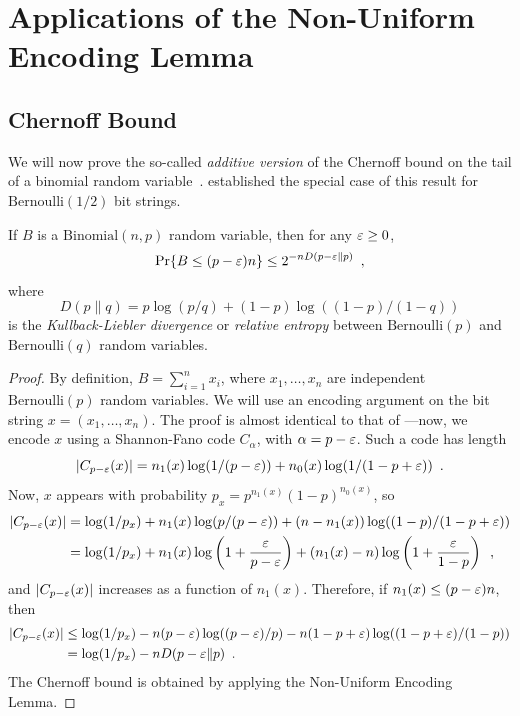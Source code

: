 \documentclass{patmorin}
\begin{document}
\section{Applications of the Non-Uniform Encoding Lemma}

\subsection{Chernoff Bound}

We will now prove the so-called \emph{additive version} of the
Chernoff bound on the tail of a binomial random
variable~\cite{chernoff:bound}.  established
the special case of this result for $\mathrm{Bernoulli}(1/2)$ bit
strings.

\begin{thm}
  If $B$ is a $\mathrm{Binomial}(n,p)$ random variable, then for any
  $\varepsilon \geq 0$,
  \[
    \Pr\{B\le(p-\varepsilon)n\} \le 2^{-nD(p-\varepsilon \| p)} \enspace ,
  \]
  where 
  \[ 
    D(p \| q)= p\log (p/q) + (1-p)\log ((1 - p)/(1 - q))
  \]
  is the \emph{Kullback-Liebler divergence} or \emph{relative entropy}
  between $\mathrm{Bernoulli}(p)$ and $\mathrm{Bernoulli}(q)$ random
  variables.
\end{thm}

\begin{proof}
  By definition, $B=\sum_{i=1}^n x_i$, where $x_1,\ldots,x_n$ are
  independent $\mathrm{Bernoulli}(p)$ random variables.  We will use
  an encoding argument on the bit string $x=(x_1,\ldots,x_n)$. The
  proof is almost identical to that of ---now,
  we encode $x$ using a Shannon-Fano code $C_\alpha$, with
  $\alpha = p - \varepsilon$. Such a code has length
  \[
    |C_{p - \varepsilon}(x)| = n_1(x) \log (1/(p - \varepsilon)) + n_0(x) \log (1/(1
    - p + \varepsilon)) \enspace .
  \]
  Now, $x$ appears with probability
  $p_x = p^{n_1(x)} (1 - p)^{n_0(x)}$, so
  \begin{align*}
    |C_{p - \varepsilon}(x)| &= \log(1/p_x) + n_1(x) \log (p/(p - \varepsilon)) + (n - n_1(x)) \log ((1 - p)/(1 - p + \varepsilon)) \\
                      &= \log (1/p_x) + n_1(x) \log \left(1 + \frac{\varepsilon}{p - \varepsilon}\right) + (n_1(x) - n) \log \left(1 + \frac{\varepsilon}{1 - p}\right) \enspace ,
  \end{align*}
  and $|C_{p - \varepsilon}(x)|$ increases as a function of
  $n_1(x)$. Therefore, if $n_1(x) \le (p - \varepsilon)n$, then
  \begin{align*}
    |C_{p - \varepsilon}(x)| &\le \log (1/p_x) - n (p - \varepsilon) \log ((p - \varepsilon)/p) - n (1 - p + \varepsilon) \log ((1 - p + \varepsilon)/(1 - p)) \\
                      &= \log (1/p_x) - n D(p - \varepsilon \| p) \enspace .
  \end{align*}
  The Chernoff bound is obtained by applying the Non-Uniform Encoding
  Lemma.
\end{proof}
\end{document}
